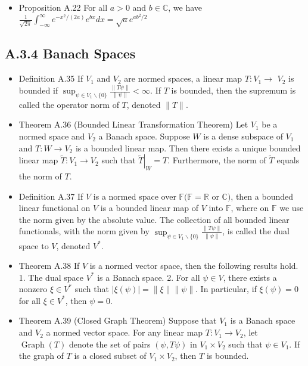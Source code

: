\begin{itemize}
\item Proposition A.22 For all $a>0$ and $b \in \mathbb{C}$, we have $\frac{1}{\sqrt{2 \pi}} \int_{-\infty}^{\infty} e^{-x^{2} /(2 a)} e^{b x} d x=\sqrt{a} e^{a b^{2} / 2}$
\end{itemize}

\subsection{A.3.4 Banach Spaces}
\begin{itemize}
\item Definition A.35 If $V_{1}$ and $V_{2}$ are normed spaces, a linear map $T: V_{1} \rightarrow$ $V_{2}$ is bounded if $\sup _{\psi \in V_{1} \backslash\{0\}} \frac{\|T \psi\|}{\|\psi\|}<\infty$. If $T$ is bounded, then the supremum is called the operator norm of $T$, denoted $\|T\|$.

\item Theorem A.36 (Bounded Linear Transformation Theorem) Let $V_{1}$ be a normed space and $V_{2}$ a Banach space. Suppose $W$ is a dense subspace of $V_{1}$ and $T: W \rightarrow V_{2}$ is a bounded linear map. Then there exists a unique bounded linear map $\tilde{T}: V_{1} \rightarrow V_{2}$ such that $\left.\tilde{T}\right|_{W}=T$. Furthermore, the norm of $\tilde{T}$ equals the norm of $T$.

\item Definition A.37 If $V$ is a normed space over $\mathbb{F}(\mathbb{F}=\mathbb{R}$ or $\mathbb{C})$, then a bounded linear functional on $V$ is a bounded linear map of $V$ into $\mathbb{F}$, where on $\mathbb{F}$ we use the norm given by the absolute value. The collection of all bounded linear functionals, with the norm given by $\sup _{\psi \in V_{1} \backslash\{0\}} \frac{\|T \psi\|}{\|\psi\|}$, is called the dual space to $V$, denoted $V^{*}$.

\item Theorem A.38 If $V$ is a normed vector space, then the following results hold.
1. The dual space $V^{*}$ is a Banach space.
2. For all $\psi \in V$, there exists a nonzero $\xi \in V^{*}$ such that $|\xi(\psi)|=\|\xi\|\|\psi\|$. In particular, if $\xi(\psi)=0$ for all $\xi \in V^{*}$, then $\psi=0$.

\item Theorem A.39 (Closed Graph Theorem) Suppose that $V_{1}$ is a Banach space and $V_{2}$ a normed vector space. For any linear map $T: V_{1} \rightarrow V_{2}$, let $\operatorname{Graph}(T)$ denote the set of pairs $(\psi, T \psi)$ in $V_{1} \times V_{2}$ such that $\psi \in V_{1}$. If the graph of $T$ is a closed subset of $V_{1} \times V_{2}$, then $T$ is bounded.
\end{itemize}


